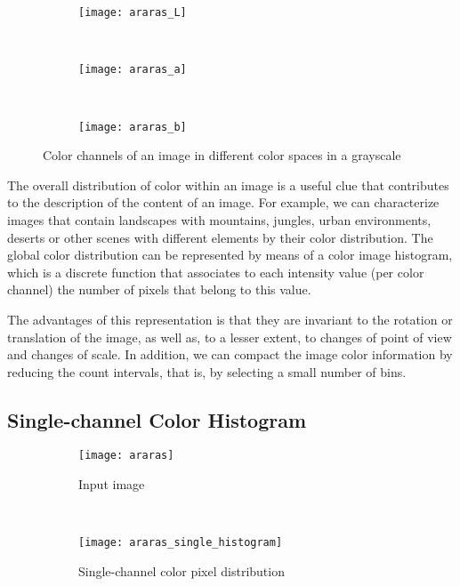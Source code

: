 \begin{figure}[!ht]
    \begin{subfigure}[t]{\textwidth+20pt\relax}
    	\texttt{[image: araras\_L]}
    \end{subfigure}    
    ~ %
    \begin{subfigure}[b]{0.3\textwidth}
        \texttt{[image: araras\_a]}
    \end{subfigure}
    ~ %
    \begin{subfigure}[b]{0.3\textwidth}
        \texttt{[image: araras\_b]}
    \end{subfigure} 

	\caption{Color channels of an image in different color spaces in a grayscale}\label{fig:images_color_space}    
\end{figure}

The overall distribution of color within an image is a useful clue that contributes to the description of the content of an image. For example, we can characterize images that contain landscapes with mountains, jungles, urban environments, deserts or other scenes with different elements by their color distribution. The global color distribution can be represented by means of a color image histogram, which is a discrete function that associates to each intensity value (per color channel) the number of pixels that belong to this value.

The advantages of this representation is that they are invariant to the rotation or translation of the image, as well as, to a lesser extent, to changes of point of view and changes of scale. In addition, we can compact the image color information by reducing the count intervals, that is, by selecting a small number of bins.

\subsection{Single-channel Color Histogram}

\begin{figure}[!ht]
    \centering
    \begin{subfigure}[b]{0.45\textwidth}
        \texttt{[image: araras]}
        \caption{Input image}
    \end{subfigure}
        ~ %
    \begin{subfigure}[b]{0.45\textwidth}
        \texttt{[image: araras\_single\_histogram]}
        \caption{Single-channel color pixel distribution}
    \end{subfigure} 
    
    \caption{}\label{fig:single_channel_histogram}    
\end{figure}
    
